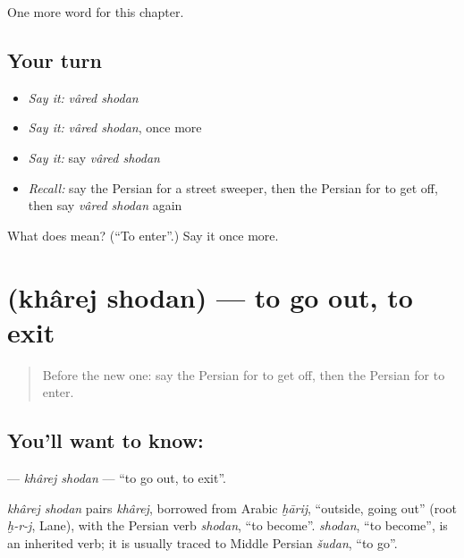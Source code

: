 \begin{grammarlens}[title={What you've built}]
One more word for this chapter.
\end{grammarlens}

\subsection*{Your turn}
\begin{itemize}
\raggedright
  \item \emph{Say it:} \emph{vâred shodan}
  \item \emph{Say it:} \emph{vâred shodan}, once more
  \item \emph{Say it:} say \emph{vâred shodan}
  \item \emph{Recall:} say the Persian for a street sweeper, then the Persian for to get off, then say \emph{vâred shodan} again
\end{itemize}

\begin{tcolorbox}[breakable,colback=teal!4,colframe=teal!35!black,title={Before you move on}]
What does   mean? (\textquotedblleft{}To enter\textquotedblright{}.) Say it once more.
\end{tcolorbox}
\section[\texorpdfstring{\fa{خارج} \fa{شدن} (khârej shodan)}{خارج شدن (khârej shodan)}]{  (khârej shodan) — to go out, to exit}

\label{lesson:FA-C253-kharej-shodan}



\begin{quote}
Before the new one: say the Persian for to get off, then the Persian for to enter.
\end{quote}

\subsection*{You'll want to know:  }
\textbf{ } — \emph{khârej shodan} — \textquotedblleft{}to go out, to exit\textquotedblright{}.

\begin{cousinweb}
\emph{khârej shodan} pairs \emph{khârej}, borrowed from Arabic \emph{ḫārij}, \textquotedblleft{}outside, going out\textquotedblright{} (root \emph{ḫ-r-j}, Lane), with the Persian verb \emph{shodan}, \textquotedblleft{}to become\textquotedblright{}. \emph{shodan}, \textquotedblleft{}to become\textquotedblright{}, is an inherited verb; it is usually traced to Middle Persian \emph{šudan}, \textquotedblleft{}to go\textquotedblright{}.
\end{cousinweb}

